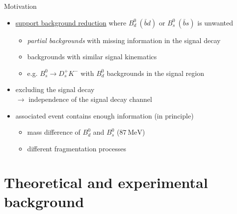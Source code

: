\documentclass[aspectratio=1610, 10pt]{beamer}
\begin{document}
\begin{frame}{Motivation}
  \begin{itemize}
    \item \underline{support background reduction} where $B^0_d \: \left(\bar{b}d\right)$ or $B^0_s \: \left(\bar{b}s\right)$ is unwanted
    \begin{itemize}
      \item \textit{partial backgrounds} with missing information in the signal decay
      \item backgrounds with similar signal kinematics
      \item e.g. $B^0_s \rightarrow D^+_s K^-$ with $B^0_d$ backgrounds in the signal region
    \end{itemize}
    \pause
    \medskip
    \item excluding the signal decay \\$\rightarrow$ independence of the signal decay channel
    \item associated event contains enough information (in principle)
    \begin{itemize}
      \item mass difference of $B^0_d$ and $B^0_s$ ($\qty{87}{\MeV}$)
      \item different fragmentation processes
    \end{itemize} 
  \end{itemize}
\end{frame}

\section*{Theoretical and experimental background}
\end{document}
